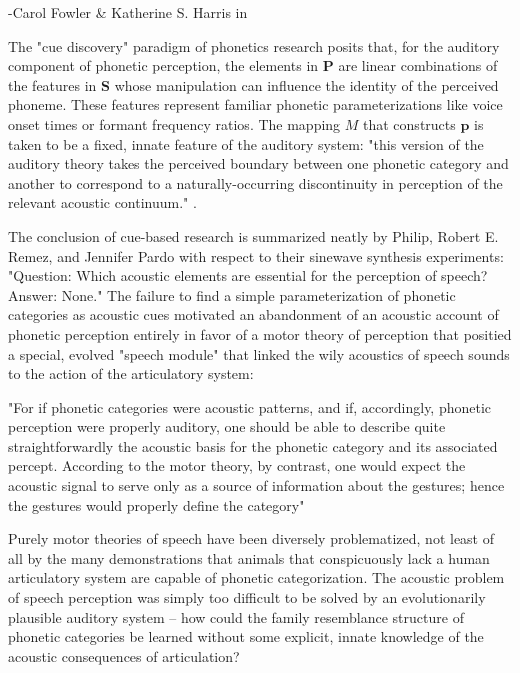 \begin{multicols}{2}
\begin{leftbar}
-Carol Fowler \& Katherine S. Harris in \cite[p.~51]{ohalaGuideHistoryPhonetic1999}
\end{leftbar}

The "cue discovery" paradigm of phonetics research posits that, for the auditory component of phonetic perception, the elements in $\mathbf{P}$ are linear combinations of the features in $\mathbf{S}$ whose manipulation can influence the identity of the perceived phoneme. These features represent familiar phonetic parameterizations like voice onset times or formant frequency ratios. The mapping $M$ that constructs $\mathbf{p}$ is taken to be a fixed, innate feature of the auditory system: "this version of the auditory theory takes the perceived boundary between one phonetic category and another to correspond to a naturally-occurring discontinuity in perception of the relevant acoustic continuum." \cite{Liberman1985a}. 

The conclusion of cue-based research is summarized neatly by Philip, Robert E. Remez, and Jennifer Pardo with respect to their sinewave synthesis experiments: "Question: Which acoustic elements are essential for the perception of speech? Answer: None\cite{HaskinsLaboratories2020}." The failure to find a simple parameterization of phonetic categories as acoustic cues motivated an abandonment of an acoustic account of phonetic perception entirely in favor of a motor theory of perception that positied a special, evolved "speech module" that linked the wily acoustics of speech sounds to the action of the articulatory system:

\begin{leftbar}
"For if phonetic categories were acoustic patterns, and if, accordingly, phonetic perception were properly auditory, one should be able to describe quite straightforwardly the acoustic basis for the phonetic category and its associated percept. According to the motor theory, by contrast, one would expect the acoustic signal to serve only as a source of information about the gestures; hence the gestures would properly define the category"
\cite{Liberman1985a}
\end{leftbar}

Purely motor theories of speech have been diversely problematized, not least of all by the many demonstrations that animals that conspicuously lack a human articulatory system are capable of phonetic categorization\cite{Carbonell2014,Lotto1997,Kluender2000}. The acoustic problem of speech perception was simply too difficult to be solved by an evolutionarily plausible auditory system -- how could the family resemblance structure of phonetic categories be learned without some explicit, innate knowledge of the acoustic consequences of articulation?\cite{Bailey1980} 


\end{multicols}
